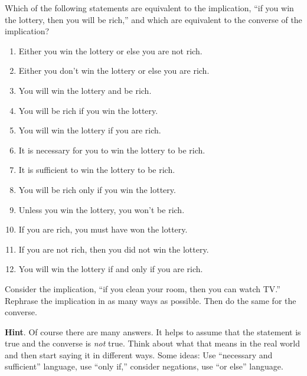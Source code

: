 \documentclass[11pt,]{book}
\theoremstyle{ptxplainnotitle}
\theoremstyle{ptxplaintitle}
\theoremstyle{ptxdefinitionnotitle}
\theoremstyle{ptxdefinitiontitle}
\theoremstyle{ptxdefinitionnotitle}
\theoremstyle{ptxdefinitiontitle}
\theoremstyle{ptxdefinitionnotitle}
\theoremstyle{ptxdefinitiontitle}
\theoremstyle{ptxdefinitiontitlenonumber}
\theoremstyle{ptxdefinitiontitlenonumber}
\numberwithin{equation}{chapter}
\begin{document}
\begin{divisionexercise}{15}\hypertarget{exercise-163}{}
\hypertarget{p-2177}{}%
Which of the following statements are equivalent to the implication, ``if you win the lottery, then you will be rich,'' and which are equivalent to the converse of the implication? \leavevmode%
\begin{enumerate}[label=(\alph*)]
\item\hypertarget{li-1122}{}\hypertarget{p-2178}{}%
Either you win the lottery or else you are not rich.%
\item\hypertarget{li-1123}{}\hypertarget{p-2179}{}%
Either you don't win the lottery or else you are rich.%
\item\hypertarget{li-1124}{}\hypertarget{p-2180}{}%
You will win the lottery and be rich.%
\item\hypertarget{li-1125}{}\hypertarget{p-2181}{}%
You will be rich if you win the lottery.%
\item\hypertarget{li-1126}{}\hypertarget{p-2182}{}%
You will win the lottery if you are rich.%
\item\hypertarget{li-1127}{}\hypertarget{p-2183}{}%
It is necessary for you to win the lottery to be rich.%
\item\hypertarget{li-1128}{}\hypertarget{p-2184}{}%
It is sufficient to win the lottery to be rich.%
\item\hypertarget{li-1129}{}\hypertarget{p-2185}{}%
You will be rich only if you win the lottery.%
\item\hypertarget{li-1130}{}\hypertarget{p-2186}{}%
Unless you win the lottery, you won't be rich.%
\item\hypertarget{li-1131}{}\hypertarget{p-2187}{}%
If you are rich, you must have won the lottery.%
\item\hypertarget{li-1132}{}\hypertarget{p-2188}{}%
If you are not rich, then you did not win the lottery.%
\item\hypertarget{li-1133}{}\hypertarget{p-2189}{}%
You will win the lottery if and only if you are rich.%
\end{enumerate}
%
\end{divisionexercise}%
\begin{divisionexercise}{16}\hypertarget{exercise-164}{}
\hypertarget{p-2203}{}%
Consider the implication, ``if you clean your room, then you can watch TV.'' Rephrase the implication in as many ways as possible. Then do the same for the converse.%
\par\smallskip%
\noindent\textbf{Hint}.\hypertarget{hint-13}{}\quad%
\hypertarget{p-2204}{}%
Of course there are many answers. It helps to assume that the statement is true and the converse is \emph{not} true. Think about what that means in the real world and then start saying it in different ways. Some ideas: Use ``necessary and sufficient'' language, use ``only if,'' consider negations, use ``or else'' language.%
\end{divisionexercise}%
\end{document}

